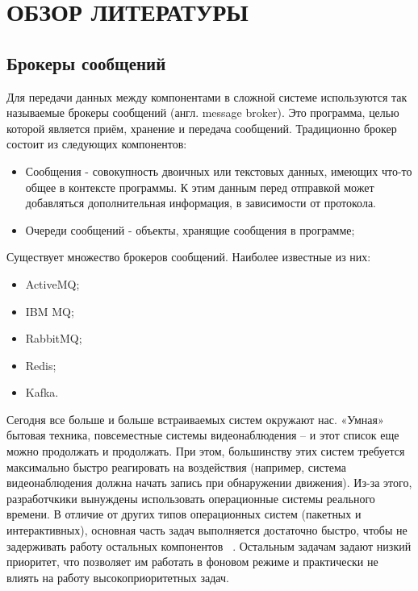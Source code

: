 \section{ОБЗОР ЛИТЕРАТУРЫ}
\label{sec:domain}

\subsection{Брокеры сообщений}

Для передачи данных между компонентами в сложной системе используются так называемые брокеры сообщений (англ. message broker).
Это программа, целью которой является приём, хранение и передача сообщений.
Традиционно брокер состоит из следующих компонентов:
\begin{itemize}
    \item Сообщения - совокупность двоичных или текстовых данных, имеющих что-то общее в контексте программы.
     К этим данным перед отправкой может добавляться дополнительная информация, в зависимости от протокола.
    \item Очереди сообщений - объекты, хранящие сообщения в программе;
\end{itemize}

Существует множество брокеров сообщений. Наиболее известные из них:
\begin{itemize}
    \item ActiveMQ;
    \item IBM MQ;
    \item RabbitMQ;
    \item Redis;
    \item Kafka.
\end{itemize}


Сегодня все больше и больше встраиваемых систем окружают нас. «Умная» бытовая
техника, повсеместные системы видеонаблюдения -- и этот список еще можно
продолжать и продолжать. При этом, большинству этих систем требуется максимально
быстро реагировать на воздействия (например, система видеонаблюдения должна начать
запись при обнаружении движения).
Из-за этого, разработчкики вынуждены использовать операционные системы
реального времени. В отличие от других типов операционных систем (пакетных и
интерактивных), основная часть задач выполняется достаточно быстро, чтобы
не задерживать работу остальных компонентов ~\cite{tanenbaum_modern_os_2015_ru}.
Остальным задачам задают низкий приоритет, что позволяет им работать в фоновом
режиме и практически не влиять на работу высокоприоритетных задач.

